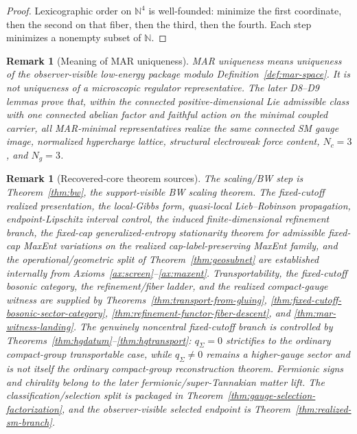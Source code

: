 \documentclass[11pt]{article}
\newtheorem{remark}[theorem]{Remark}
\begin{document}
\begin{proof}
Lexicographic order on \(\mathbb N^4\) is well-founded: minimize the first coordinate, then the second on that fiber, then the third, then the fourth. Each step minimizes a nonempty subset of \(\mathbb N\).
\end{proof}

\begin{remark}[Meaning of MAR uniqueness]\label{rem:mar-uniqueness}
MAR uniqueness means uniqueness of the observer-visible low-energy package modulo Definition~\ref{def:mar-space}. It is not uniqueness of a microscopic regulator representative. The later D8--D9 lemmas prove that, within the connected positive-dimensional Lie admissible class with one connected abelian factor and faithful action on the minimal coupled carrier, all MAR-minimal representatives realize the same connected SM gauge image, normalized hypercharge lattice, structural electroweak force content, \(N_c=3\), and \(N_g=3\).
\end{remark}

\begin{remark}[Recovered-core theorem sources]\label{ass:technical}
The scaling/BW step is Theorem~\ref{thm:bw}, the support-visible BW scaling theorem. The fixed-cutoff realized presentation, the local-Gibbs form, quasi-local Lieb--Robinson propagation, endpoint-Lipschitz interval control, the induced finite-dimensional refinement branch, the fixed-cap generalized-entropy stationarity theorem for admissible fixed-cap MaxEnt variations on the realized cap-label-preserving MaxEnt family, and the operational/geometric split of Theorem~\ref{thm:geosubnet} are established internally from Axioms~\ref{ax:screen}--\ref{ax:maxent}. Transportability, the fixed-cutoff bosonic category, the refinement/fiber ladder, and the realized compact-gauge witness are supplied by Theorems~\ref{thm:transport-from-gluing}, \ref{thm:fixed-cutoff-bosonic-sector-category}, \ref{thm:refinement-functor-fiber-descent}, and \ref{thm:mar-witness-landing}. The genuinely noncentral fixed-cutoff branch is controlled by Theorems~\ref{thm:hgdatum}--\ref{thm:hgtransport}: \(q_\Sigma=0\) strictifies to the ordinary compact-group transportable case, while \(q_\Sigma\ne0\) remains a higher-gauge sector and is not itself the ordinary compact-group reconstruction theorem. Fermionic signs and chirality belong to the later fermionic/super-Tannakian matter lift.
The classification/selection split is packaged in Theorem~\ref{thm:gauge-selection-factorization},
and the observer-visible selected endpoint is Theorem~\ref{thm:realized-sm-branch}.
\end{remark}
\end{document}
